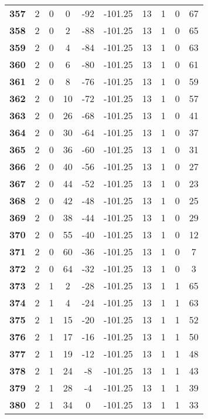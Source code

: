 \documentclass{article}%
\begin{document}
\begin{longtable}{cccccccccc}
        \textbf{357} & 2 & 0 & 0 & -92 & -101.25 & 13 & 1 & 0 & 67 \\ 
        \textbf{358} & 2 & 0 & 2 & -88 & -101.25 & 13 & 1 & 0 & 65 \\ 
        \textbf{359} & 2 & 0 & 4 & -84 & -101.25 & 13 & 1 & 0 & 63 \\ 
        \textbf{360} & 2 & 0 & 6 & -80 & -101.25 & 13 & 1 & 0 & 61 \\ 
        \textbf{361} & 2 & 0 & 8 & -76 & -101.25 & 13 & 1 & 0 & 59 \\ 
        \textbf{362} & 2 & 0 & 10 & -72 & -101.25 & 13 & 1 & 0 & 57 \\ 
        \textbf{363} & 2 & 0 & 26 & -68 & -101.25 & 13 & 1 & 0 & 41 \\ 
        \textbf{364} & 2 & 0 & 30 & -64 & -101.25 & 13 & 1 & 0 & 37 \\ 
        \textbf{365} & 2 & 0 & 36 & -60 & -101.25 & 13 & 1 & 0 & 31 \\ 
        \textbf{366} & 2 & 0 & 40 & -56 & -101.25 & 13 & 1 & 0 & 27 \\ 
        \textbf{367} & 2 & 0 & 44 & -52 & -101.25 & 13 & 1 & 0 & 23 \\ 
        \textbf{368} & 2 & 0 & 42 & -48 & -101.25 & 13 & 1 & 0 & 25 \\ 
        \textbf{369} & 2 & 0 & 38 & -44 & -101.25 & 13 & 1 & 0 & 29 \\ 
        \textbf{370} & 2 & 0 & 55 & -40 & -101.25 & 13 & 1 & 0 & 12 \\ 
        \textbf{371} & 2 & 0 & 60 & -36 & -101.25 & 13 & 1 & 0 & 7 \\ 
        \textbf{372} & 2 & 0 & 64 & -32 & -101.25 & 13 & 1 & 0 & 3 \\ 
        \textbf{373} & 2 & 1 & 2 & -28 & -101.25 & 13 & 1 & 1 & 65 \\ 
        \textbf{374} & 2 & 1 & 4 & -24 & -101.25 & 13 & 1 & 1 & 63 \\ 
        \textbf{375} & 2 & 1 & 15 & -20 & -101.25 & 13 & 1 & 1 & 52 \\ 
        \textbf{376} & 2 & 1 & 17 & -16 & -101.25 & 13 & 1 & 1 & 50 \\ 
        \textbf{377} & 2 & 1 & 19 & -12 & -101.25 & 13 & 1 & 1 & 48 \\ 
        \textbf{378} & 2 & 1 & 24 & -8 & -101.25 & 13 & 1 & 1 & 43 \\ 
        \textbf{379} & 2 & 1 & 28 & -4 & -101.25 & 13 & 1 & 1 & 39 \\ 
        \textbf{380} & 2 & 1 & 34 & 0 & -101.25 & 13 & 1 & 1 & 33 \\ 

\end{longtable}
\end{document}
